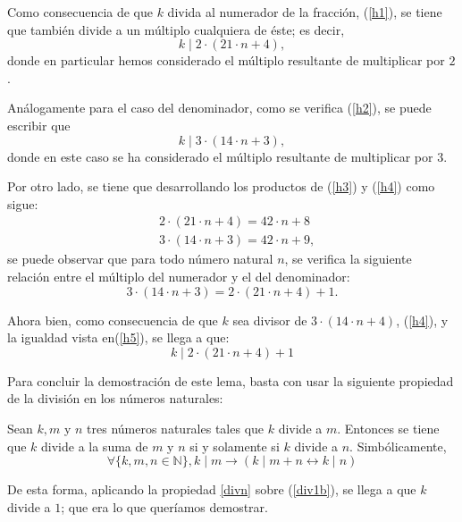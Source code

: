 \begin{demostracion}
  Como consecuencia de que \(k\) divida al numerador de la fracción,
  (\ref{h1}), se tiene que también divide a un múltiplo cualquiera de
  éste; es decir,
  \begin{equation}\label{h3}\tag{h3}
    k \mid 2⋅(21⋅n+4),
  \end{equation}
  donde en particular hemos considerado el múltiplo resultante de
  multiplicar por \(2\).

  Análogamente para el caso del denominador, como se verifica
  (\ref{h2}), se puede escribir que
  \begin{equation}\label{h4}\tag{h4}
    k \mid 3⋅(14⋅n+3),
  \end{equation}
  donde en este caso se ha considerado el múltiplo resultante de
  multiplicar por \(3\).

  Por otro lado, se tiene que desarrollando los productos de (\ref{h3}) y
  (\ref{h4}) como sigue:
  \begin{align}
    & 2⋅(21⋅n+4)=42⋅n+8    \\
    & 3·(14·n+3)=42·n+9,
  \end{align}
  se puede observar que para todo número natural \(n\), se verifica la
  siguiente relación entre el múltiplo del numerador y el del denominador:
  \begin{equation}\label{h5}\tag{h5}
    3⋅(14⋅n+3)=2⋅(21⋅n+4)+1.
  \end{equation}

  Ahora bien, como consecuencia de que \(k\) sea divisor de
  \(3⋅(14⋅n+4)\), (\ref{h4}), y la igualdad vista en(\ref{h5}), se llega
  a que:
  \begin{equation}\label{div1b}
    k \mid 2⋅(21⋅n+4)+1
  \end{equation}

  Para concluir la demostración de este lema, basta con usar la siguiente
  propiedad de la división en los números naturales:

  \begin{proposicion}\label{divn}
    Sean \(k,m\) y \(n\) tres números naturales tales que \(k\) divide a
    \(m\). Entonces se tiene que \(k\) divide a la suma de \(m\) y \(n\)
    si y solamente si \(k\) divide a \(n\). Simbólicamente,
    \begin{equation}
      ∀ \{k, m, n ∈ ℕ\}, k ∣ m → (k ∣ m + n ↔ k ∣ n)
    \end{equation}
  \end{proposicion}

  De esta forma, aplicando la propiedad \ref{divn} sobre (\ref{div1b}),
  se llega a que \(k\) divide a \(1\); que era lo que queríamos
  demostrar.
\end{demostracion}

